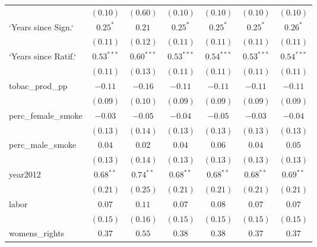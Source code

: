 \begin{table}[!h]
\begin{center}
\begin{tabular}{l c c c c c c }
                        & $(0.10)$      & $(0.60)$      & $(0.10)$      & $(0.10)$      & $(0.10)$      & $(0.10)$      \\
`Years since Sign.`     & $0.25^{*}$    & $0.21$        & $0.25^{*}$    & $0.25^{*}$    & $0.25^{*}$    & $0.26^{*}$    \\
                        & $(0.11)$      & $(0.12)$      & $(0.11)$      & $(0.11)$      & $(0.11)$      & $(0.11)$      \\
`Years since Ratif.`    & $0.53^{***}$  & $0.60^{***}$  & $0.53^{***}$  & $0.54^{***}$  & $0.53^{***}$  & $0.54^{***}$  \\
                        & $(0.11)$      & $(0.13)$      & $(0.11)$      & $(0.11)$      & $(0.11)$      & $(0.11)$      \\
tobac\_prod\_pp         & $-0.11$       & $-0.16$       & $-0.11$       & $-0.11$       & $-0.11$       & $-0.11$       \\
                        & $(0.09)$      & $(0.10)$      & $(0.09)$      & $(0.09)$      & $(0.09)$      & $(0.09)$      \\
perc\_female\_smoke     & $-0.03$       & $-0.05$       & $-0.04$       & $-0.05$       & $-0.03$       & $-0.04$       \\
                        & $(0.13)$      & $(0.14)$      & $(0.13)$      & $(0.13)$      & $(0.13)$      & $(0.13)$      \\
perc\_male\_smoke       & $0.04$        & $0.02$        & $0.04$        & $0.06$        & $0.04$        & $0.05$        \\
                        & $(0.13)$      & $(0.14)$      & $(0.13)$      & $(0.13)$      & $(0.13)$      & $(0.13)$      \\
year2012                & $0.68^{**}$   & $0.74^{**}$   & $0.68^{**}$   & $0.68^{**}$   & $0.68^{**}$   & $0.69^{**}$   \\
                        & $(0.21)$      & $(0.25)$      & $(0.21)$      & $(0.21)$      & $(0.21)$      & $(0.21)$      \\
labor                   & $0.07$        & $0.11$        & $0.07$        & $0.08$        & $0.07$        & $0.07$        \\
                        & $(0.15)$      & $(0.16)$      & $(0.15)$      & $(0.15)$      & $(0.15)$      & $(0.15)$      \\
womens\_rights          & $0.37$        & $0.55$        & $0.38$        & $0.38$        & $0.37$        & $0.37$        \\

\end{tabular}
\end{center}
\end{table}
